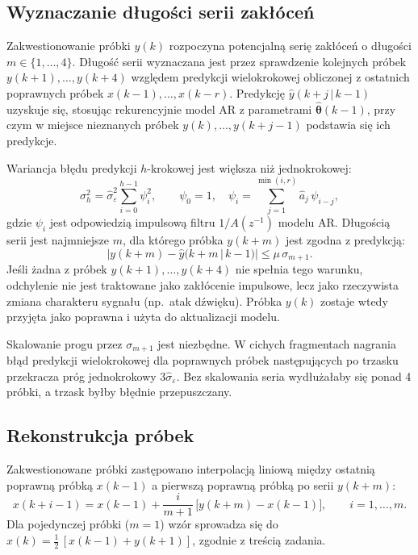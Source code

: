 \documentclass[11pt,a4paper]{article}
\begin{document}
\subsection{Wyznaczanie długości serii zakłóceń}
\label{sec:seria}

Zakwestionowanie próbki $y(k)$ rozpoczyna potencjalną serię zakłóceń
o długości $m \in \{1,\dots,4\}$. Długość serii wyznaczana jest przez
sprawdzenie kolejnych próbek $y(k+1), \dots, y(k+4)$ względem predykcji
wielokrokowej obliczonej z ostatnich poprawnych próbek
$x(k-1),\dots,x(k-r)$. Predykcję $\hat y(k+j\,|\,k-1)$ uzyskuje się,
stosując rekurencyjnie model AR z parametrami $\hat{\boldsymbol\theta}(k-1)$,
przy czym w miejsce nieznanych próbek $y(k),\dots,y(k+j-1)$ podstawia się
ich predykcje.

Wariancja błędu predykcji $h$-krokowej jest większa niż jednokrokowej:
\begin{equation}
  \sigma_h^2 = \hat\sigma^2_\varepsilon \sum_{i=0}^{h-1} \psi_i^2, \qquad
  \psi_0 = 1,\quad \psi_i = \sum_{j=1}^{\min(i,r)} \hat a_j\, \psi_{i-j},
\end{equation}
gdzie $\psi_i$ jest odpowiedzią impulsową filtru $1/A(z^{-1})$ modelu AR.
Długością serii jest najmniejsze $m$, dla którego próbka $y(k+m)$ jest
zgodna z predykcją:
\begin{equation}
  |y(k+m) - \hat y(k+m\,|\,k-1)| \le \mu\, \sigma_{m+1}.
\end{equation}
Jeśli żadna z próbek $y(k+1),\dots,y(k+4)$ nie spełnia tego warunku,
odchylenie nie jest traktowane jako zakłócenie impulsowe, lecz jako
rzeczywista zmiana charakteru sygnału (np.\ atak dźwięku). Próbka $y(k)$
zostaje wtedy przyjęta jako poprawna i użyta do aktualizacji modelu.

Skalowanie progu przez $\sigma_{m+1}$ jest niezbędne. W cichych fragmentach
nagrania błąd predykcji wielokrokowej dla poprawnych próbek następujących
po trzasku przekracza próg jednokrokowy $3\hat\sigma_\varepsilon$. Bez
skalowania seria wydłużałaby się ponad 4 próbki, a trzask byłby błędnie
przepuszczany.

\subsection{Rekonstrukcja próbek}
\label{sec:rekonstrukcja}

Zakwestionowane próbki zastępowano interpolacją liniową między ostatnią
poprawną próbką $x(k-1)$ a pierwszą poprawną próbką po serii $y(k+m)$:
\begin{equation}
  x(k+i-1) = x(k-1) + \frac{i}{m+1}\,\big[y(k+m) - x(k-1)\big],
  \qquad i = 1,\dots,m .
\end{equation}
Dla pojedynczej próbki ($m=1$) wzór sprowadza się do
$x(k) = \tfrac12\,[x(k-1) + y(k+1)]$, zgodnie z treścią zadania.
\end{document}
